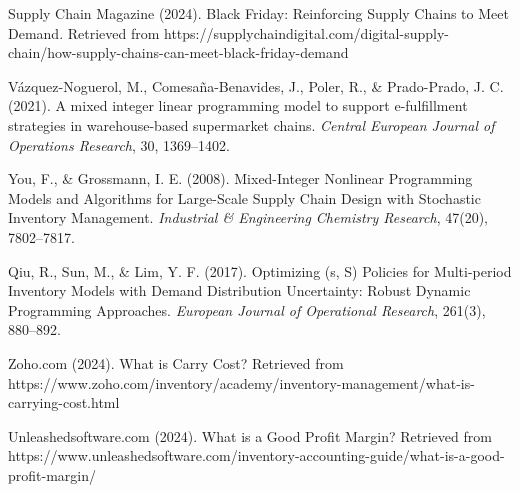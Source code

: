 \documentclass[a4paper,12pt]{article}
\begin{document}
\begin{thebibliography}{99}
Supply Chain Magazine (2024).
Black Friday: Reinforcing Supply Chains to Meet Demand.
Retrieved from https://supplychaindigital.com/digital-supply-chain/how-supply-chains-can-meet-black-friday-demand

Vázquez-Noguerol, M., Comesaña-Benavides, J., Poler, R., \& Prado-Prado, J. C. (2021).
A mixed integer linear programming model to support e-fulfillment strategies in warehouse-based supermarket chains. \textit{Central European Journal of Operations Research}, 30, 1369--1402.

You, F., \& Grossmann, I. E. (2008).
Mixed-Integer Nonlinear Programming Models and Algorithms for Large-Scale Supply Chain Design with Stochastic Inventory Management. \textit{Industrial \& Engineering Chemistry Research}, 47(20), 7802--7817.

Qiu, R., Sun, M., \& Lim, Y. F. (2017).
Optimizing (s, S) Policies for Multi-period Inventory Models with Demand Distribution Uncertainty: Robust Dynamic Programming Approaches. \textit{European Journal of Operational Research}, 261(3), 880--892.

Zoho.com (2024).
What is Carry Cost?
Retrieved from https://www.zoho.com/inventory/academy/inventory-management/what-is-carrying-cost.html

Unleashedsoftware.com (2024).
What is a Good Profit Margin?
Retrieved from https://www.unleashedsoftware.com/inventory-accounting-guide/what-is-a-good-profit-margin/

\end{thebibliography}
\end{document}
